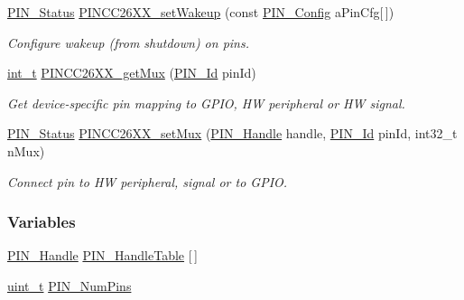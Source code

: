 \begin{DoxyCompactItemize}
\hyperlink{_p_i_n_8h_abe0ad59bbf09e51fe37195a5e70b23f6}{P\-I\-N\-\_\-\-Status} \hyperlink{_p_i_n_c_c26_x_x_8h_a7eea7460f3e2d4c68df55239471805aa}{P\-I\-N\-C\-C26\-X\-X\-\_\-set\-Wakeup} (const \hyperlink{_p_i_n_8h_ae427b7d2925f9b0f3145e455cfdb5841}{P\-I\-N\-\_\-\-Config} a\-Pin\-Cfg\mbox{[}$\,$\mbox{]})
\begin{DoxyCompactList}\small\item\em Configure wakeup (from shutdown) on pins. \end{DoxyCompactList}\item 
\hyperlink{_p_i_n_8h_ab6fd6105e64ed14a0c9281326f05e623}{int\-\_\-t} \hyperlink{_p_i_n_c_c26_x_x_8h_a568b24bc5bf40ce5f525be32a67c969a}{P\-I\-N\-C\-C26\-X\-X\-\_\-get\-Mux} (\hyperlink{_p_i_n_8h_a9ae8197f460bb76ea09a84f47d09921f}{P\-I\-N\-\_\-\-Id} pin\-Id)
\begin{DoxyCompactList}\small\item\em Get device-\/specific pin mapping to G\-P\-I\-O, H\-W peripheral or H\-W signal. \end{DoxyCompactList}\item 
\hyperlink{_p_i_n_8h_abe0ad59bbf09e51fe37195a5e70b23f6}{P\-I\-N\-\_\-\-Status} \hyperlink{_p_i_n_c_c26_x_x_8h_ac8cbb649db80dd03d8e8a487aef43294}{P\-I\-N\-C\-C26\-X\-X\-\_\-set\-Mux} (\hyperlink{_p_i_n_8h_afb2de52b054638f63c39df1f30a0d88d}{P\-I\-N\-\_\-\-Handle} handle, \hyperlink{_p_i_n_8h_a9ae8197f460bb76ea09a84f47d09921f}{P\-I\-N\-\_\-\-Id} pin\-Id, int32\-\_\-t n\-Mux)
\begin{DoxyCompactList}\small\item\em Connect pin to H\-W peripheral, signal or to G\-P\-I\-O. \end{DoxyCompactList}\end{DoxyCompactItemize}
\subsubsection*{Variables}
\begin{DoxyCompactItemize}
\item 
\hyperlink{_p_i_n_8h_afb2de52b054638f63c39df1f30a0d88d}{P\-I\-N\-\_\-\-Handle} \hyperlink{_p_i_n_c_c26_x_x_8h_a29e70a78c6a3f320797dc1db539988ac}{P\-I\-N\-\_\-\-Handle\-Table} \mbox{[}$\,$\mbox{]}
\item 
\hyperlink{_p_i_n_8h_a12a1e9b3ce141648783a82445d02b58d}{uint\-\_\-t} \hyperlink{_p_i_n_c_c26_x_x_8h_a138463d5bac2d11077c400c268491136}{P\-I\-N\-\_\-\-Num\-Pins}
\end{DoxyCompactItemize}


